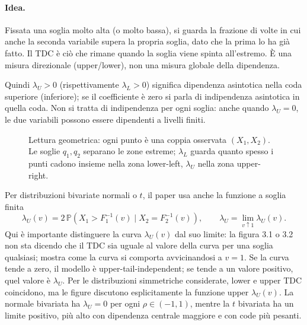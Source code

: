 \documentclass[11pt,a4paper]{article}
\newcommand{\Prob}{\mathbb{P}}
\newcommand{\Idea}{\paragraph{Idea.}}
\begin{document}
\Idea Fissata una soglia molto alta (o molto bassa), si guarda la frazione di
volte in cui anche la seconda variabile supera la propria soglia, dato che la
prima lo ha già fatto. Il TDC è ciò che rimane quando la soglia viene spinta
all'estremo. È una misura direzionale (upper/lower), non una misura globale
della dipendenza.

Quindi $\lambda_U>0$ (rispettivamente $\lambda_L>0$) significa dipendenza
asintotica nella coda superiore (inferiore); se il coefficiente è zero si
parla di indipendenza asintotica in quella coda. Non si tratta di
indipendenza per ogni soglia: anche quando $\lambda_U=0$, le due variabili
possono essere dipendenti a livelli finiti.

\begin{figure}[ht]
\centering
{}
\caption{Lettura geometrica: ogni punto è una coppia osservata $(X_1,X_2)$. Le soglie $q_1,q_2$ separano le zone estreme; $\lambda_L$ guarda quanto spesso i punti cadono insieme nella zona lower-left, $\lambda_U$ nella zona upper-right.}
\label{fig:quadrants}
\end{figure}

Per distribuzioni bivariate normali o $t$, il paper usa anche la funzione a
soglia finita
\begin{equation}
  \lambda_U(v)=2\,\Prob\!\left(X_1>F_1^{-1}(v)\mid
  X_2=F_2^{-1}(v)\right),\qquad
  \lambda_U=\lim_{v\uparrow1}\lambda_U(v).
  \label{eq:finite}
\end{equation}
Qui è importante distinguere la curva $\lambda_U(v)$ dal suo limite: la
figura 3.1 o 3.2 non sta dicendo che il TDC sia uguale al valore della curva
per una soglia qualsiasi; mostra come la curva si comporta avvicinandosi a
$v=1$. Se la curva tende a zero, il modello è upper-tail-independent; se tende
a un valore positivo, quel valore è $\lambda_U$. Per le distribuzioni
simmetriche considerate, lower e upper TDC coincidono, ma le figure discutono
esplicitamente la funzione upper $\lambda_U(v)$. La normale bivariata ha
$\lambda_U=0$ per ogni $\rho\in(-1,1)$, mentre la $t$ bivariata ha un limite
positivo, più alto con dipendenza centrale maggiore e con code più pesanti.
\end{document}
